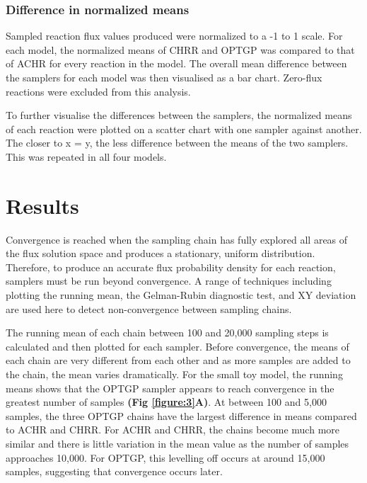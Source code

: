 \documentclass[10pt,letterpaper]{article}
\begin{document}
\subsubsection*{Difference in normalized means}
Sampled reaction flux values produced were normalized to a -1 to 1 scale. For each model, the normalized means of CHRR and OPTGP was compared to that of ACHR for every reaction in the model. The overall mean difference between the samplers for each model was then visualised as a bar chart. Zero-flux reactions were excluded from this analysis.

To further visualise the differences between the samplers, the normalized means of each reaction were plotted on a scatter chart with one sampler against another. The closer to x = y, the less difference between the means of the two samplers. This was repeated in all four models.

\section*{Results}

Convergence is reached when the sampling chain has fully explored all areas of the flux solution space and produces a stationary, uniform distribution. Therefore, to produce an accurate flux probability density for each reaction, samplers must be run beyond convergence. A range of techniques including plotting the running mean, the Gelman-Rubin diagnostic test, and XY deviation are used here to detect non-convergence between sampling chains. 

The running mean of each chain between 100 and 20,000 sampling steps is calculated and then plotted for each sampler. Before convergence, the means of each chain are very different from each other and as more samples are added to the chain, the mean varies dramatically. For the small toy model, the running means shows that the OPTGP sampler appears to reach convergence in the greatest number of samples \textbf{(Fig \ref{figure:3}A)}. At between 100 and 5,000 samples, the three OPTGP chains have the largest difference in means compared to ACHR and CHRR. For ACHR and CHRR, the chains become much more similar and there is little variation in the mean value as the number of samples approaches 10,000. For OPTGP, this levelling off occurs at around 15,000 samples, suggesting that convergence occurs later. 
\end{document}
